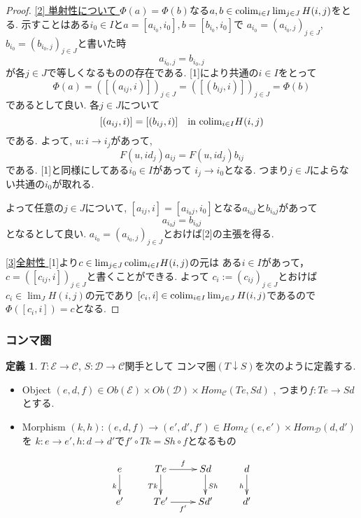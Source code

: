 \documentclass[dvipdfmx,a4paper,11pt]{report}
\newcommand{\colim}{{\rm colim}}
\theoremstyle{definition}
\newtheorem{dfn}[thm]{定義}
\begin{document}
\begin{proof}
\underline{[2] 単射性について }
$\Phi(a)=\Phi(b)$なる$a, b \in \colim_{i \in I} \lim_{j \in J}H(i,j)$をとる. 
示すことはある$i_0 \in I$と$a =[a_{i_0}, i_0], b =[b_{i_0}, i_0]$で
$a_{i_0} = (a_{i_{0},j})_{j \in J}$, $b_{i_0} = (b_{i_{0},j})_{j \in J}$と書いた時
$$
a_{i_{0},j} = b_{i_{0},j}
$$
が各$j \in J$で等しくなるものの存在である. 
[1]により共通の$i \in I$をとって
$$
\Phi(a) = ([(a_{ij}, i)])_{j \in J} = ([(b_{ij}, i)])_{j \in J} = \Phi(b)$$
であるとして良い. 
各$j \in J$について
$$
[(a_{ij}, i)] = [(b_{ij}, i)] \quad \text{in $\colim_{i \in I} H(i,j)$}
$$
である. 
よって, $u : i \to i_{j}$があって, 
$$
F(u, id_{j})a_{ij} = F(u, id_{j})b_{ij}
$$
である. [1]と同様にしてある$i_{0} \in I$があって
$i_{j} \to i_{0}$となる.
つまり$j \in J$によらない共通の$i_{0}$が取れる.

よって任意の$j \in J$について, $[a_{ij}, i] = [a_{i_{0}j}, i_{0}]$となる$a_{i_{0}j}$と$b_{i_{0}j}$があって
$$
a_{i_{0}j} = b_{i_{0}j}
$$
となるとして良い. 
$a_{i_0} = (a_{i_{0},j})_{j \in J}$とおけば[2]の主張を得る. 

\underline{[3]全射性 } 
[1]より$c \in \lim_{j \in J}\colim_{i \in I} H(i,j)$の元は
ある$i \in I$があって， $c= ([c_{ij}, i])_{j \in J}$と書くことができる. 
よって
$c_{i}:=(c_{ij})_{j \in J}$とおけば$c_i \in \lim_{J}H(i,j)$の元であり
$[c_{i} , i] \in \colim_{i \in I} \lim_{j \in J}H(i,j)$であるので
$\Phi([c_i , i])=c$となる. 
\end{proof}

\subsubsection{コンマ圏}
 \begin{tcolorbox}
 [colback = white, colframe = green!35!black, fonttitle = \bfseries,breakable = true]
\begin{dfn}\cite[2.6節]{Mac}
$T :  \mathcal{E} \to \mathcal{C}$, $S : \mathcal{D} \to \mathcal{C}$関手として
コンマ圏$(T \downarrow S)$を次のように定義する. 
\begin{itemize}
\item Object $(e,d,f) \in Ob(\mathcal{E}) \times Ob(\mathcal{D}) \times Hom_{\mathcal{C}}(Te, Sd)$ , つまり$f : Te \to Sd$とする.
\item Morphism $(k,h) : (e,d,f)  \to (e',d',f') \in Hom_{\mathcal{E}}(e,e') \times Hom_{\mathcal{D}}(d,d') $ を $k : e \to e', h: d \to d'$で$f' \circ Tk = Sh \circ f$となるもの
\end{itemize}

\begin{equation*}
\xymatrix@C=25pt@R=20pt{
e \ar@{->}[d] _{k}&Te\ar@{->}[d]_{Tk}  \ar@{->}[r]^{f} & Sd\ar@{->}[d]^{Sh} &d\ar@{->}[d]_{h}\\
e'&Te'\ar@{->}[r]_{f'} &Sd'&d' \\   
}
\end{equation*}
\end{dfn}
\end{tcolorbox}
\end{document}
